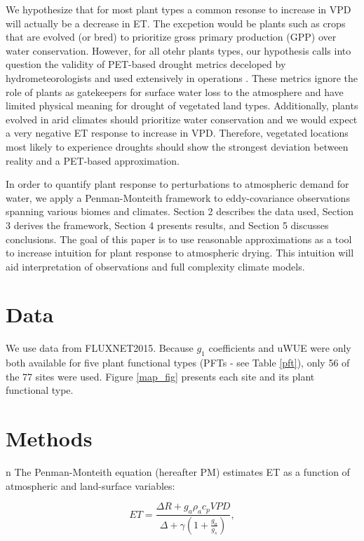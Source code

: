 \documentclass[draft,linenumbers]{agujournal}
\begin{document}
We hypothesize that for most plant types a common resonse to increase in VPD will actually be a decrease in ET. The excpetion would be plants such as crops that are evolved (or bred) to prioritize gross primary production (GPP) over water conservation. However, for all otehr plants types, our hypothesis calls into question the validity of PET-based drought metrics deceloped by hydrometeorologists and used extensively in operations \citep[e.g. PDSI, P-PET,][]{2002, Alley_1984} . These metrics ignore the role of plants as gatekeepers for surface water loss to the atmosphere and have limited physical meaning for drought of vegetated land types. Additionally, plants evolved in arid climates should prioritize water conservation and we would expect a very negative ET response to increase in VPD. Therefore, vegetated locations most likely to experience droughts should show the strongest deviation between reality and a PET-based approximation. 

In order to quantify plant response to perturbations to atmospheric demand for water, we apply a Penman-Monteith framework to eddy-covariance observations spanning various biomes and climates. Section 2 describes the data used, Section 3 derives the framework, Section 4 presents results, and Section 5 discusses conclusions. The goal of this paper is to use reasonable approximations as a tool to increase intuition for plant response to atmospheric drying. This intuition will aid interpretation of observations and full complexity climate models. 

\section{Data}
\label{data}
We use data from FLUXNET2015. Because $g_1$ coefficients \citep{Lin_2015} and uWUE were only both available for five plant functional types (PFTs - see Table \ref{pft}),  only 56 of the 77 sites were used. Figure \ref{map_fig}  presents each site and its plant functional type.

\section{Methods}
n
The Penman-Monteith equation (hereafter PM) estimates ET as a function of atmospheric and land-surface variables:
\begin{linenomath*}
  \begin{equation}
      ET = \frac{\Delta R + g_a \rho_a c_p VPD}{\Delta + \gamma(1 + \frac{g_a}{g_s})},
  \end{equation}
\end{linenomath*}
\end{document}
